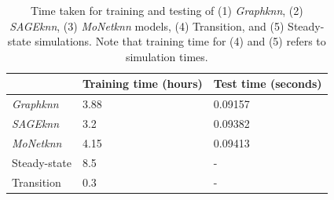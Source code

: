 \begin{table}[ht]
    \centering
    \caption{Time taken for training and testing of  (1) \textit{Graphknn}, (2) \textit{SAGEknn}, (3) \textit{MoNetknn} models, (4) Transition, and (5) Steady-state simulations. Note that training time for (4) and (5) refers to simulation times.} 
    \label{t:times}
    \begin{tabular}{|l|l|l|}
    \hline
    & \textbf{Training time (hours)} & \textbf{Test time (seconds)} \\
    \hline
    \textit{Graphknn} & 3.88 & 0.09157 \\
    \hline
    \textit{SAGEknn} & 3.2 & 0.09382 \\
    \hline
    \textit{MoNetknn} & 4.15 & 0.09413 \\
    \hline
    Steady-state& 8.5 & - \\
    \hline
    Transition & 0.3 & - \\
    \hline
    \end{tabular}
\end{table}

